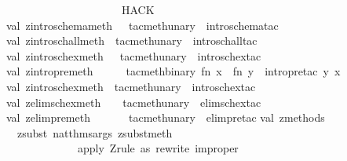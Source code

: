 \begin{isabellebody}
\ \ \ \ \ \ \ \ \ \ \ \ \ \ \ \ \ \ \ {\isacharparenleft}{\isacharasterisk}\ {\isacharcircum}{\isacharcircum}{\isacharcircum}{\isacharcircum}{\isacharcircum}{\isacharcircum}{\isacharcircum}{\isacharcircum}{\isacharcircum}{\isacharcircum}{\isacharcircum}{\isacharcircum}{\isacharcircum}{\isacharcircum}{\isacharcircum}{\isacharcircum}{\isacharcircum}{\isacharcircum}{\isacharcircum}\ HACK\ {\isacharasterisk}{\isacharparenright}\ \isanewline
\isanewline
val\ zintro{\isacharunderscore}schema{\isacharunderscore}meth\ \ {\isacharequal}\ tac{}meth{\isacharunderscore}unary\ \ intro{\isacharunderscore}schema{\isacharunderscore}tac{\isacharsemicolon}\isanewline
val\ zintro{\isacharunderscore}sch{\isacharunderscore}all{\isacharunderscore}meth\ {\isacharequal}\ tac{}meth{\isacharunderscore}unary\ \ intro{\isacharunderscore}sch{\isacharunderscore}all{\isacharunderscore}tac\isanewline
val\ zintro{\isacharunderscore}sch{\isacharunderscore}ex{\isacharunderscore}meth\ \ {\isacharequal}\ tac{}meth{\isacharunderscore}unary\ \ intro{\isacharunderscore}sch{\isacharunderscore}ex{\isacharunderscore}tac\isanewline
val\ zintro{\isacharunderscore}pre{\isacharunderscore}meth\ \ \ \ \ {\isacharequal}\ tac{}meth{\isacharunderscore}binary\ {\isacharparenleft}fn\ x\ {\isacharequal}{\isachargreater}\ fn\ y\ {\isacharequal}{\isachargreater}\ intro{\isacharunderscore}pre{\isacharunderscore}tac\ y\ x{\isacharparenright}\ \isanewline
val\ zintro{\isacharunderscore}sch{\isacharunderscore}ex{}{\isacharunderscore}meth\ {\isacharequal}\ tac{}meth{\isacharunderscore}unary\ \ intro{\isacharunderscore}sch{\isacharunderscore}ex{}{\isacharunderscore}tac\isanewline
val\ zelim{\isacharunderscore}sch{\isacharunderscore}ex{\isacharunderscore}meth\ \ \ {\isacharequal}\ tac{}meth{\isacharunderscore}unary\ \ elim{\isacharunderscore}sch{\isacharunderscore}ex{\isacharunderscore}tac\isanewline
val\ zelim{\isacharunderscore}pre{\isacharunderscore}meth\ \ \ \ \ \ {\isacharequal}\ tac{}meth{\isacharunderscore}unary\ \ elim{\isacharunderscore}pre{\isacharunderscore}tac\isanewline
\isanewline
{\isacharverbatimclose}\isanewline
\isanewline
\isanewline
{}\isamarkupfalse%
{\isacharverbatimopen}\isanewline
\isanewline
val\ zmethods\ {\isacharequal}\ {\isacharbrackleft}\isanewline
\ \ {\isacharparenleft}{\isachardoublequote}zsubst{\isachardoublequote}{\isacharcomma}\ nat{\isacharunderscore}thms{\isacharunderscore}args\ zsubst{\isacharunderscore}meth{\isacharcomma}\ \isanewline
\ \ \ \ \ \ \ \ \ \ \ \ \ {\isachardoublequote}apply\ Z{\isacharminus}rule\ as\ rewrite\ {\isacharparenleft}improper{\isacharparenright}{\isachardoublequote}{\isacharparenright}{\isacharcomma}\isanewline

\end{isabellebody}
